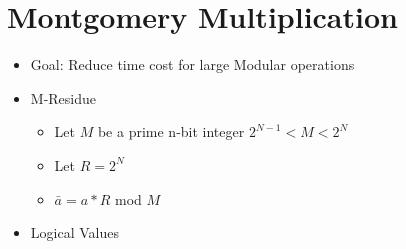 \section{Montgomery Multiplication}
\begin{itemize}
\item Goal: Reduce time cost for large Modular operations
\item M-Residue
    \begin{itemize}
    \item Let $M$ be a prime n-bit integer $2^{N-1} < M < 2^N$
    \item Let $R = 2^N$
    \item $\bar{a} = a*R$ mod $M$
    \end{itemize}
\item Logical Values
\end{itemize}